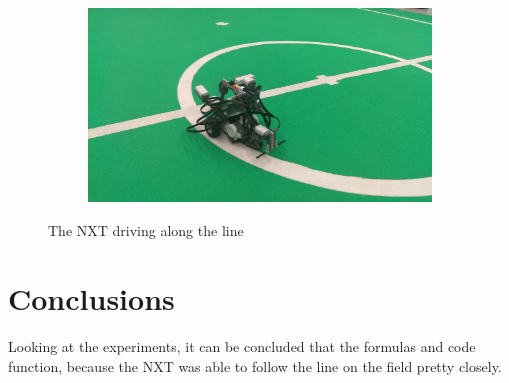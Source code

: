 \documentclass[12pt]{article}
\begin{document}
\begin{figure}[h!]
    ~ 
    \begin{subfigure}[b]{0.3333\textwidth}
            \includegraphics[width=\textwidth]{lijn3.jpg}
    \end{subfigure}
    \caption{The NXT driving along the line}
    \label{driveline}
\end{figure}
\section{Conclusions}
Looking at the experiments, it can be concluded that the formulas and code function, because the NXT was able to follow the line on the field pretty closely.
\end{document}
